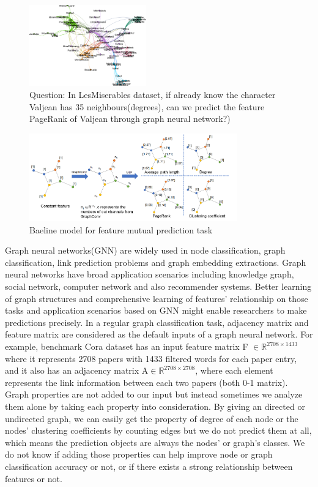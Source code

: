 \documentclass[sigconf]{acmart}
\begin{document}
\begin{figure}[!h]
    \centering
    \includegraphics[width = 0.45\textwidth]{fig/LesMiserables.eps}
    \caption{Question: In LesMiserables dataset, if already know the character Valjean has 35 neighbours(degrees), can we predict the feature PageRank of Valjean through graph neural network?) }
\end{figure}

\begin{figure}
    \centering
    \includegraphics[width=0.8\textwidth]{Pipeline.jpg}
    \caption{Baeline model for feature mutual prediction task}
\end{figure}


 Graph neural networks(GNN) are widely used in node classification, graph classification, link prediction problems and graph embedding extractions. Graph neural networks have broad application scenarios including knowledge graph, social network, computer network and also recommender systems. Better learning of graph structures and comprehensive learning of features' relationship on those tasks and application scenarios based on GNN might enable researchers to make predictions precisely. In a regular graph classification task, adjacency matrix and feature matrix are considered as the default inputs of a graph neural network. For example, benchmark Cora dataset has an input feature matrix F  $\in \mathbb{R}^{2708 \times1433}$ where it represents 2708 papers with 1433 filtered words for each paper entry, and it also has an adjacency matrix A$ \in \mathbb{R}^{2708 \times2708}$, 
where each element represents the link information between each two papers (both 0-1 matrix). Graph properties are not added to our input but instead sometimes we analyze them alone by taking each property into consideration. By giving an directed or undirected graph, we can easily get the property of degree of each node or the nodes' clustering coefficients by counting edges but we do not predict them at all, which means the prediction objects are always the nodes' or graph's classes. We do not know if adding those properties can help improve node or graph classification accuracy or not, or if there exists a strong relationship between features or not. 
\end{document}
